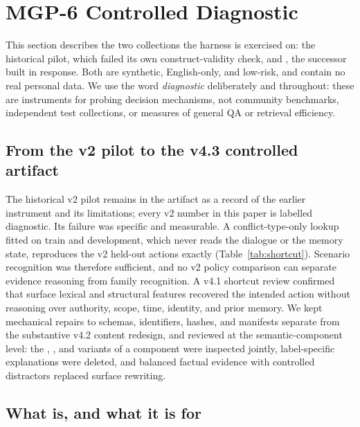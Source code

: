 \section{MGP-6 Controlled Diagnostic}
\label{sec:mgp6}

This section describes the two collections the harness is exercised on: the
historical \mgp{} pilot, which failed its own construct-validity check, and
\mgpc{}, the successor built in response. Both are synthetic, English-only, and
low-risk, and contain no real personal data. We use the word \emph{diagnostic}
deliberately and throughout: these are instruments for probing decision
mechanisms, not community benchmarks, independent test collections, or measures
of general QA or retrieval efficiency.

\subsection{From the v2 pilot to the v4.3 controlled artifact}

The historical v2 pilot remains in the artifact as a record of the earlier
instrument and its limitations; every v2 number in this paper is labelled
diagnostic. Its failure was specific and measurable. A conflict-type-only lookup
fitted on train and development, which never reads the dialogue or the memory
state, reproduces the v2 held-out actions exactly (Table~\ref{tab:shortcut}).
Scenario recognition was therefore sufficient, and no v2 policy comparison can
separate evidence reasoning from family recognition. A v4.1 shortcut review
confirmed that surface lexical and structural features recovered the intended
action without reasoning over authority, scope, time, identity, and prior
memory. We kept mechanical repairs to schemas, identifiers, hashes, and
manifests separate from the substantive v4.2 content redesign, and reviewed at
the semantic-component level: the \keep, \supersede, and \abstain{} variants of
a component were inspected jointly, label-specific explanations were deleted,
and balanced factual evidence with controlled distractors replaced surface
rewriting.

\subsection{What \mgpc{} is, and what it is for}
\label{sec:v43}

